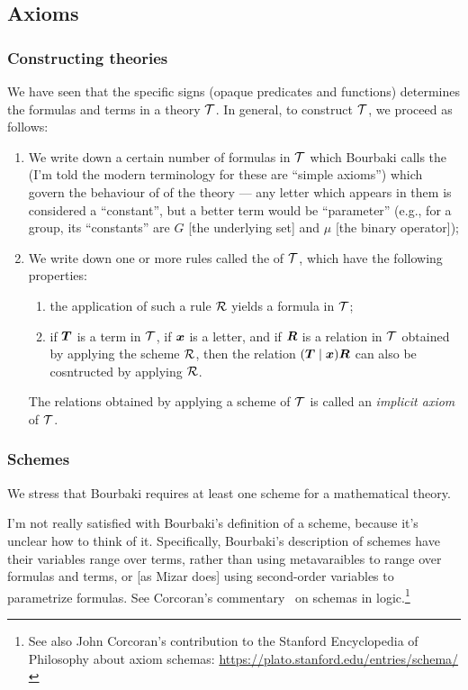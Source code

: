 \subsection{Axioms}\label{subsec:2-1:axioms}

\subsubsection{Constructing theories}\label{subsec:axioms:constructing-theories}
We have seen that the specific signs (opaque predicates and functions)
determines the formulas and terms in a theory $\mathcal{T}$. In general,
to construct $\mathcal{T}$, we proceed as follows:
\begin{enumerate}
\item We write down a certain number of formulas in $\mathcal{T}$ which
  Bourbaki calls the  (I'm told the modern
  terminology for these are ``simple axioms'') which govern the
  behaviour of  of the theory --- any letter which
  appears in them is considered a ``constant'', but a better term would
  be ``parameter'' (e.g., for a group, its ``constants'' are $G$ [the
    underlying set] and $\mu$ [the binary operator]);
\item We write down one or more rules called the  of
  $\mathcal{T}$, which have the following properties:
  \begin{enumerate}
  \item the application of such a rule $\mathcal{R}$ yields a formula in $\mathcal{T}$;
  \item if $\boldsymbol{T}$ is a term in $\mathcal{T}$, if
    $\boldsymbol{x}$ is a letter, and if $\boldsymbol{R}$ is a
    relation in $\mathcal{T}$ obtained by applying the scheme
    $\mathcal{R}$, then the relation
    $(\boldsymbol{T}\mid\boldsymbol{x})\boldsymbol{R}$ can also be
    cosntructed by applying $\mathcal{R}$.
  \end{enumerate}
  The relations obtained by applying a scheme of $\mathcal{T}$ is called
  an \emph{implicit axiom} of $\mathcal{T}$.
\end{enumerate}

\subsubsection{Schemes}
We stress that Bourbaki requires at least one scheme for a mathematical
theory.

I'm not really satisfied with Bourbaki's definition of a scheme, because
it's unclear how to think of it. Specifically, Bourbaki's description of
schemes have their variables range over terms, rather than using
metavaraibles to range over formulas and terms, or [as Mizar does] using
second-order variables to parametrize formulas. See Corcoran's
commentary~\cite{corcoran2006schemata} on schemas in logic.\footnote{See
also John Corcoran's contribution to the Stanford Encyclopedia of
Philosophy about axiom schemas: \url{https://plato.stanford.edu/entries/schema/}}

